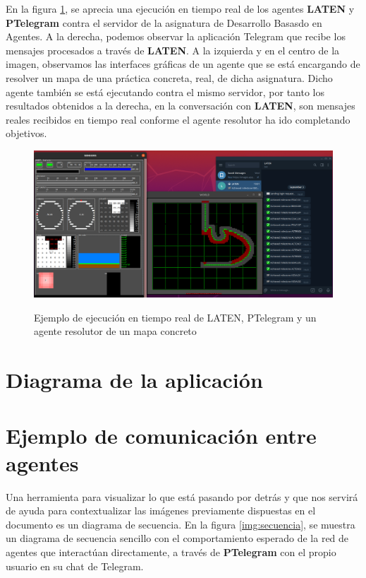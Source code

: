 En la figura \ref{img:ejecucion1}, se aprecia una ejecución en tiempo real de los agentes \textbf{LATEN} y \textbf{PTelegram} contra el servidor de la asignatura de Desarrollo Basasdo en Agentes. A la derecha, podemos observar la aplicación Telegram que recibe los mensajes procesados a través de \textbf{LATEN}. A la izquierda y en el centro de la imagen, observamos las interfaces gráficas de un agente que se está encargando de resolver un mapa de una práctica concreta, real, de dicha asignatura. Dicho agente también se está ejecutando contra el mismo servidor, por tanto los resultados obtenidos a la derecha, en la conversación con \textbf{LATEN}, son mensajes reales recibidos en tiempo real conforme el agente resolutor ha ido completando objetivos.

\begin{figure}[h]
\centering
\includegraphics[width=1.1\textwidth]{logos/ejecucion1.png}\\[1.4cm]
\caption{Ejemplo de ejecución en tiempo real de LATEN, PTelegram y un agente resolutor de un mapa concreto}
\label{img:ejecucion1}
\end{figure}

\section{Diagrama de la aplicación}

\section{Ejemplo de comunicación entre agentes}

Una herramienta para visualizar lo que está pasando por detrás y que nos servirá de ayuda para contextualizar las imágenes previamente dispuestas en el documento es un diagrama de secuencia. En la figura \ref{img:secuencia}, se muestra un diagrama de secuencia sencillo con el comportamiento esperado de la red de agentes que interactúan directamente, a través de \textbf{PTelegram} con el propio usuario en su chat de Telegram.

